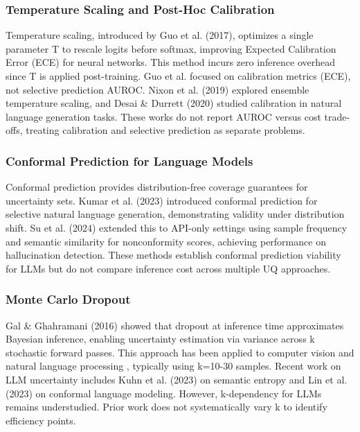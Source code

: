 
\subsubsection{Temperature Scaling and Post-Hoc Calibration}

Temperature scaling, introduced by Guo et al. (2017), optimizes a single parameter T to rescale logits before softmax, improving Expected Calibration Error (ECE) for neural networks. This method incurs zero inference overhead since T is applied post-training. Guo et al. focused on calibration metrics (ECE), not selective prediction AUROC. Nixon et al. (2019) explored ensemble temperature scaling, and Desai \& Durrett (2020) studied calibration in natural language generation tasks. These works do not report AUROC versus cost trade-offs, treating calibration and selective prediction as separate problems.

\subsubsection{Conformal Prediction for Language Models}

Conformal prediction provides distribution-free coverage guarantees for uncertainty sets. Kumar et al. (2023) introduced conformal prediction for selective natural language generation, demonstrating validity under distribution shift. Su et al. (2024) extended this to API-only settings using sample frequency and semantic similarity for nonconformity scores, achieving performance on hallucination detection. These methods establish conformal prediction viability for LLMs but do not compare inference cost across multiple UQ approaches.

\subsubsection{Monte Carlo Dropout}

Gal \& Ghahramani (2016) showed that dropout at inference time approximates Bayesian inference, enabling uncertainty estimation via variance across k stochastic forward passes. This approach has been applied to computer vision \citep{Kendall2017Uncertainties} and natural language processing \citep{Xiao2019Dropout}, typically using k=10-30 samples. Recent work on LLM uncertainty includes Kuhn et al. (2023) on semantic entropy and Lin et al. (2023) on conformal language modeling. However, k-dependency for LLMs remains understudied. Prior work does not systematically vary k to identify efficiency points.

